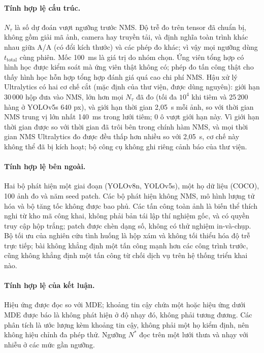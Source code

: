 \documentclass[a4paper,fleqn]{cas-dc}
\newcommand{\Ntau}{N_{\tau}}
\begin{document}
\paragraph{Tính hợp lệ cấu trúc.}
$\Ntau$ là số dự đoán vượt ngưỡng trước NMS. Độ trễ đo trên tensor đã chuẩn bị, không gồm giải mã ảnh, camera hay truyền tải, và định nghĩa toàn trình khác nhau giữa A/A (có đổi kích thước) và các phép đo khác; vì vậy mọi ngưỡng dùng $t_{\mathrm{total}}$ cùng phiên. Mốc 100~ms là giá trị do nhóm chọn. Ứng viên tổng hợp có hình học được kiểm soát mà ứng viên thật không có; phép đo tấn công thật cho thấy hình học hỗn hợp tổng hợp đánh giá quá cao chi phí NMS. Hậu xử lý Ultralytics có hai cơ chế cắt (mặc định của thư viện, được dùng nguyên): giới hạn 30\,000 hộp đưa vào NMS, lớn hơn mọi $\Ntau$ đã đo (tối đa $10^4$ khi tiêm và 25\,200 hàng ở YOLOv5s 640 px), và giới hạn thời gian 2,05~s mỗi ảnh, so với thời gian NMS trung vị lớn nhất 140~ms trong lưới tiêm; 0 ô vượt giới hạn này. Vì giới hạn thời gian được so với thời gian đã trôi bên trong chính hàm NMS, và mọi thời gian NMS Ultralytics đo được đều thấp hơn nhiều so với 2,05~s, cơ chế này không thể đã bị kích hoạt; bộ công cụ không ghi riêng cảnh báo của thư viện.
\paragraph{Tính hợp lệ bên ngoài.}
Hai bộ phát hiện một giai đoạn (YOLOv8n, YOLOv5s), một họ dữ liệu (COCO), 100 ảnh đo và năm seed patch. Các bộ phát hiện không NMS, mô hình lượng tử hóa và bộ tăng tốc không được bao phủ. Các tấn công toàn ảnh là biến thể thích nghi từ kho mã công khai, không phải bản tái lập thí nghiệm gốc, và có quyền truy cập hộp trắng; patch được chèn dạng số, không có thử nghiệm in-và-chụp. Bộ tối ưu của nghiên cứu tình huống là hộp xám và không tối thiểu hóa độ trễ trực tiếp; bài không khẳng định một tấn công mạnh hơn các công trình trước, cũng không khẳng định một tấn công từ chối dịch vụ trên hệ thống triển khai nào.
\paragraph{Tính hợp lệ của kết luận.}
Hiệu ứng được đọc so với MDE; khoảng tin cậy chứa một hoặc hiệu ứng dưới MDE được báo là không phát hiện ở độ nhạy đó, không phải tương đương. Các phân tích là ước lượng kèm khoảng tin cậy, không phải một họ kiểm định, nên không hiệu chỉnh đa phép thử. Ngưỡng $N^{*}$ đọc trên một lưới thưa và nhạy với nhiễu ở các mức gần ngưỡng.
\end{document}
